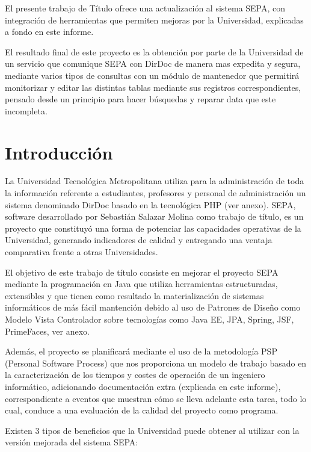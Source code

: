 \documentclass[a4paper,12pt,openany,oneside]{book}
\begin{document}

El presente trabajo de Título ofrece una actualización al sistema SEPA, con integración de herramientas que permiten mejoras por la Universidad, explicadas a fondo en este informe.

El resultado final de este proyecto es la obtención por parte de la Universidad de un servicio que comunique SEPA con DirDoc de manera mas expedita y segura, mediante varios tipos de consultas con un módulo de mantenedor que permitirá monitorizar y editar las distintas tablas mediante sus registros correspondientes, pensado desde un principio para hacer búsquedas y reparar data que este incompleta.

\tableofcontents
\listoffigures
\listoftables
\chapter*{Introducción}
\thispagestyle{empty}
La Universidad Tecnológica Metropolitana utiliza para la administración de toda la información referente a estudiantes, profesores y personal de administración un sistema denominado DirDoc basado en la tecnológica PHP (ver anexo). SEPA, software desarrollado por Sebastián Salazar Molina como trabajo de título, es un proyecto que constituyó una forma de potenciar las capacidades operativas de la Universidad, generando indicadores de calidad y entregando una ventaja comparativa frente a otras Universidades.

El objetivo de este trabajo de título consiste en mejorar el proyecto SEPA mediante la programación en Java que utiliza herramientas estructuradas, extensibles y que tienen como resultado la materialización de sistemas informáticos de más fácil mantención debido al uso de Patrones de Diseño como Modelo Vista Controlador sobre tecnologías como Java EE, JPA, Spring, JSF, PrimeFaces, ver anexo.

Además, el proyecto se planificará mediante el uso de la metodología PSP (Personal Software Process) que nos proporciona un modelo de trabajo basado en la caracterización de los tiempos y costes de operación de un ingeniero informático, adicionando documentación extra (explicada en este informe), correspondiente a eventos que muestran cómo se lleva adelante esta tarea, todo lo cual, conduce a una evaluación de la calidad del proyecto como programa.

Existen 3 tipos de beneficios que la Universidad puede obtener al utilizar con la versión mejorada del sistema SEPA:
\end{document}
